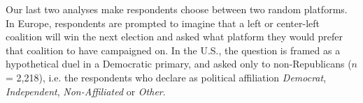 \begin{bibunit}



Our last two analyses make respondents choose between two random platforms. In Europe, respondents are prompted to imagine that a left or center-left coalition will win the next election and asked what platform they would prefer that coalition to have campaigned on. In the U.S., the question is framed as a hypothetical duel in a Democratic primary, and asked only to non-Republicans ($n$ = 2,218), i.e. the respondents who declare as political affiliation \textit{Democrat}, \textit{Independent}, \textit{Non-Affiliated} or \textit{Other}. 


\end{bibunit}
